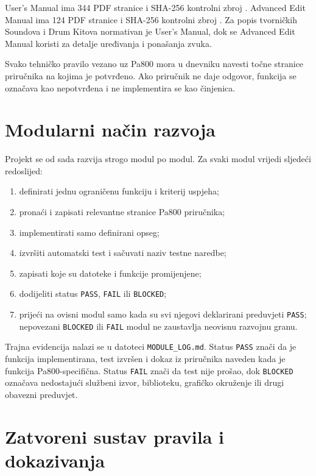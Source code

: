\documentclass[11pt]{article}
\begin{document}
User's Manual ima 344 PDF stranice i SHA-256 kontrolni zbroj
.
Advanced Edit Manual ima 124 PDF stranice i SHA-256 kontrolni zbroj
.
Za popis tvorničkih Soundova i Drum Kitova normativan je User's Manual, dok se
Advanced Edit Manual koristi za detalje uređivanja i ponašanja zvuka.

Svako tehničko pravilo vezano uz Pa800 mora u dnevniku navesti točne stranice
priručnika na kojima je potvrđeno. Ako priručnik ne daje odgovor, funkcija se
označava kao nepotvrđena i ne implementira se kao činjenica.

\section{Modularni način razvoja}

Projekt se od sada razvija strogo modul po modul. Za svaki modul vrijedi
sljedeći redoslijed:

\begin{enumerate}[label=M\arabic*.]
    \item definirati jednu ograničenu funkciju i kriterij uspjeha;
    \item pronaći i zapisati relevantne stranice Pa800 priručnika;
    \item implementirati samo definirani opseg;
    \item izvršiti automatski test i sačuvati naziv testne naredbe;
    \item zapisati koje su datoteke i funkcije promijenjene;
    \item dodijeliti status \texttt{PASS}, \texttt{FAIL} ili
    \texttt{BLOCKED};
    \item prijeći na ovisni modul samo kada su svi njegovi deklarirani
    preduvjeti \texttt{PASS}; nepovezani \texttt{BLOCKED} ili \texttt{FAIL}
    modul ne zaustavlja neovisnu razvojnu granu.
\end{enumerate}

Trajna evidencija nalazi se u datoteci \texttt{MODULE\_LOG.md}. Status
\texttt{PASS} znači da je funkcija implementirana, test izvršen i dokaz iz
priručnika naveden kada je funkcija Pa800-specifična. Status \texttt{FAIL}
znači da test nije prošao, dok \texttt{BLOCKED} označava nedostajući službeni
izvor, biblioteku, grafičko okruženje ili drugi obavezni preduvjet.

\section{Zatvoreni sustav pravila i dokazivanja}
\end{document}
